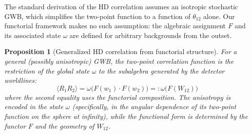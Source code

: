 \documentclass[11pt,a4paper]{article}
\newtheorem{proposition}{Proposition}[section]
\begin{document}
The standard derivation of the HD correlation assumes an isotropic stochastic GWB, which simplifies the two-point function to a function of $\theta_{12}$ alone. Our functorial framework makes no such assumption: the algebraic assignment $F$ and its associated state $\omega$ are defined for arbitrary backgrounds from the outset.

\begin{proposition}[Generalized HD correlation from functorial structure]
For a general (possibly anisotropic) GWB, the two-point correlation function is the restriction of the global state $\omega$ to the subalgebra generated by the detector worldlines:
\begin{equation}
\langle R_1 R_2 \rangle = \omega\bigl(F(w_1) \cdot F(w_2)\bigr) =: \omega\bigl(F(W_{12})\bigr)
\end{equation}
where the second equality uses the functorial composition. The anisotropy is encoded in the state $\omega$ (specifically, in the angular dependence of its two-point function on the sphere at infinity), while the functional form is determined by the functor $F$ and the geometry of $W_{12}$.
\end{proposition}
\end{document}
